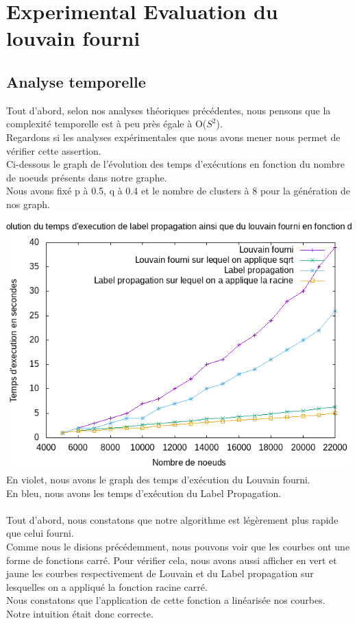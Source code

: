 \documentclass[a4paper,10pt]{report}
\begin{document}
\section{Experimental Evaluation du louvain fourni}
\subsection{Analyse temporelle}
Tout d'abord, selon nos analyses théoriques précédentes, nous pensons que la complexité temporelle est à peu près égale à O($S^2$).
\\
Regardons si les analyses expérimentales que nous avons mener nous permet de vérifier cette assertion.
\\
Ci-dessous le graph de l'évolution des temps d'exécutions en fonction du nombre de noeuds présents dans notre graphe.
\\
Nous avons fixé p à 0.5, q à 0.4 et le nombre de clusters à 8 pour la génération de nos graph.
\\
\includegraphics[scale=0.6]{./Datas/graphTempsExecutionLabelLouvain.png}
\\
\newline
En violet, nous avons le graph des temps d'exécution du Louvain fourni.
\\
En bleu, nous avons les temps d'exécution du Label Propagation.
\\
\\
Tout d'abord, nous constatons que notre algorithme est légèrement plus rapide que celui fourni.
\\
Comme nous le disions précédemment, nous pouvons voir que les courbes ont une forme de fonctions carré.
Pour vérifier cela, nous avons aussi afficher en vert et jaune les courbes respectivement de Louvain et du Label propagation sur lesquelles on a appliqué la fonction racine carré. 
\\
Nous constatons que l'application de cette fonction a linéarisée nos courbes. 
\\
Notre intuition était donc correcte.
\\
\end{document}
